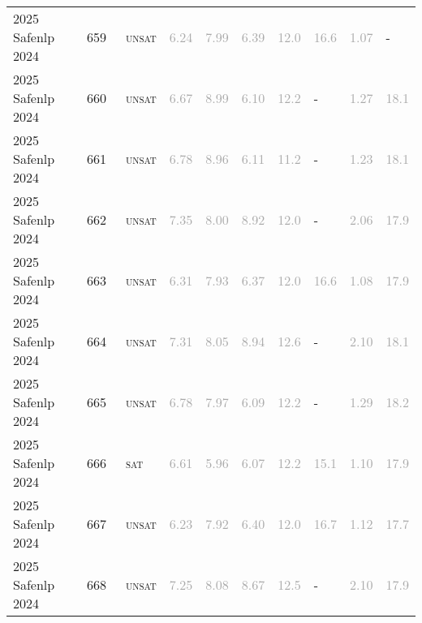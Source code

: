 \begin{center}
{\begin{longtable}{@{}llllllllll@{}}
2025 Safenlp 2024 & 659 & ~\textsc{unsat} & \textcolor{darkgray}{6.24} & \textcolor{darkgray}{7.99} & \textcolor{darkgray}{6.39} & \textcolor{darkgray}{12.0} & \textcolor{darkgray}{16.6} & \textcolor{darkgray}{1.07} & - \\
2025 Safenlp 2024 & 660 & ~\textsc{unsat} & \textcolor{darkgray}{6.67} & \textcolor{darkgray}{8.99} & \textcolor{darkgray}{6.10} & \textcolor{darkgray}{12.2} & - & \textcolor{darkgray}{1.27} & \textcolor{darkgray}{18.1} \\
2025 Safenlp 2024 & 661 & ~\textsc{unsat} & \textcolor{darkgray}{6.78} & \textcolor{darkgray}{8.96} & \textcolor{darkgray}{6.11} & \textcolor{darkgray}{11.2} & - & \textcolor{darkgray}{1.23} & \textcolor{darkgray}{18.1} \\
2025 Safenlp 2024 & 662 & ~\textsc{unsat} & \textcolor{darkgray}{7.35} & \textcolor{darkgray}{8.00} & \textcolor{darkgray}{8.92} & \textcolor{darkgray}{12.0} & - & \textcolor{darkgray}{2.06} & \textcolor{darkgray}{17.9} \\
2025 Safenlp 2024 & 663 & ~\textsc{unsat} & \textcolor{darkgray}{6.31} & \textcolor{darkgray}{7.93} & \textcolor{darkgray}{6.37} & \textcolor{darkgray}{12.0} & \textcolor{darkgray}{16.6} & \textcolor{darkgray}{1.08} & \textcolor{darkgray}{17.9} \\
2025 Safenlp 2024 & 664 & ~\textsc{unsat} & \textcolor{darkgray}{7.31} & \textcolor{darkgray}{8.05} & \textcolor{darkgray}{8.94} & \textcolor{darkgray}{12.6} & - & \textcolor{darkgray}{2.10} & \textcolor{darkgray}{18.1} \\
2025 Safenlp 2024 & 665 & ~\textsc{unsat} & \textcolor{darkgray}{6.78} & \textcolor{darkgray}{7.97} & \textcolor{darkgray}{6.09} & \textcolor{darkgray}{12.2} & - & \textcolor{darkgray}{1.29} & \textcolor{darkgray}{18.2} \\
2025 Safenlp 2024 & 666 & ~\textsc{sat} & \textcolor{darkgray}{6.61} & \textcolor{darkgray}{5.96} & \textcolor{darkgray}{6.07} & \textcolor{darkgray}{12.2} & \textcolor{darkgray}{15.1} & \textcolor{darkgray}{1.10} & \textcolor{darkgray}{17.9} \\
2025 Safenlp 2024 & 667 & ~\textsc{unsat} & \textcolor{darkgray}{6.23} & \textcolor{darkgray}{7.92} & \textcolor{darkgray}{6.40} & \textcolor{darkgray}{12.0} & \textcolor{darkgray}{16.7} & \textcolor{darkgray}{1.12} & \textcolor{darkgray}{17.7} \\
2025 Safenlp 2024 & 668 & ~\textsc{unsat} & \textcolor{darkgray}{7.25} & \textcolor{darkgray}{8.08} & \textcolor{darkgray}{8.67} & \textcolor{darkgray}{12.5} & - & \textcolor{darkgray}{2.10} & \textcolor{darkgray}{17.9} \\

\end{longtable}}
\end{center}
